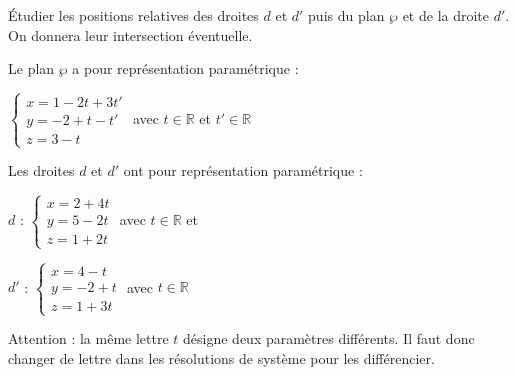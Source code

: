 \begin{methode*1}

  \exercice

  \vspace{-\baselineskip}

  \bgroup
  \def\columnseprule{.5pt}
  \begin{multicols}{2}
    Étudier  les positions relatives des
    droites $d$ et  $d'$ puis du plan $\wp$ et de la droite $d'$. On
    donnera leur intersection éventuelle.

    Le plan $\wp$ a pour représentation paramétrique :

    $\begin{cases} x=1-2t+3t'\\y=-2+t-t'\\z=3-t \end{cases}$ avec
    $t\in\mathbb{R}$ et $t'\in\mathbb{R}$

    \columnbreak

    Les droites $d$ et $d'$ ont pour représentation \mbox{paramétrique} :

    $d$ : $\begin{cases} x=2+4t\\y=5-2t\\z=1+2t \end{cases}$ avec
    $t\in\mathbb{R}$ et 

    $d'$ : $\begin{cases} x=4-t\\y=-2+t\\z=1+3t \end{cases}$ avec
    $t\in\mathbb{R}$
  \end{multicols}
  \egroup

  \correction

Attention : la même lettre $t$ désigne deux paramètres différents. Il faut donc changer de lettre dans les résolutions de système pour les différencier.\\


\end{methode*1}
